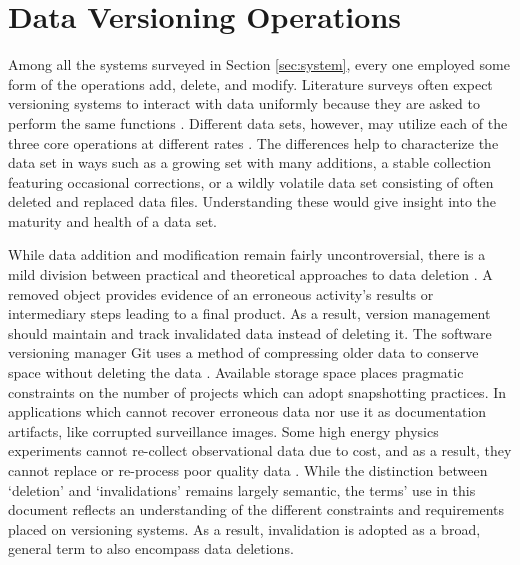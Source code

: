 \section{Data Versioning Operations}

Among all the systems surveyed in Section \ref{sec:system}, every one employed some form of the operations add, delete, and modify.
Literature surveys often expect versioning systems to interact with data uniformly because they are asked to perform the same functions \cite{Tagger2005}.
Different data sets, however, may utilize each of the three core operations at different rates \cite{rohtua}.
The differences help to characterize the data set in ways such as a growing set with many additions, a stable collection featuring occasional corrections, or a wildly volatile data set consisting of often deleted and replaced data files.
Understanding these would give insight into the maturity and health of a data set.

While data addition and modification remain fairly uncontroversial, there is a mild division between practical and theoretical approaches to data deletion \cite{Flouris04clotho:transparent}.
A removed object provides evidence of an erroneous activity's results or intermediary steps leading to a final product.
As a result, version management should maintain and track invalidated data instead of deleting it.
The software versioning manager Git uses a method of compressing older data to conserve space without deleting the data \cite{Chacon:2009:PG:1618548}.
Available storage space places pragmatic constraints on the number of projects which can adopt snapshotting practices.
In applications which cannot recover erroneous data nor use it as documentation artifacts, like corrupted surveillance images.
Some high energy physics experiments cannot re-collect observational data due to cost, and as a result, they cannot replace or re-process poor quality data \cite{Cavanaugh2002}.
While the distinction between `deletion' and `invalidations' remains largely semantic, the terms' use in this document reflects an understanding of the different constraints and requirements placed on versioning systems.
As a result, invalidation is adopted as a broad, general term to also encompass data deletions.

